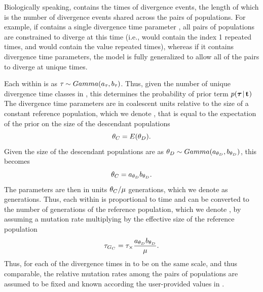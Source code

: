 \documentclass[letterpaper,12pt]{article}
\begin{document}
\begin{linenumbers}
Biologically speaking, \divTimeVector contains the times of divergence events,
the length of which \divTimeNum is the number of divergence events shared across
the \npairs{} pairs of populations.
For example, if \divTimeVector contains a single divergence time parameter
, all \npairs{} pairs of populations are constrained to diverge at
this time (i.e., \divTimeIndexVector would contain the index 1 repeated
\npairs{} times, and \divTimeMapVector would contain the value 
repeated \npairs{} times), whereas if it contains \npairs{} divergence time
parameters, the model is fully generalized to allow all of the pairs to diverge
at unique times.

\begin{linenomath}
Each \divTime{} within \divTimeVector is \iid as $\tau_{} \sim
Gamma(a_{\tau_{}}, b_{\tau_{}})$.
Thus, given the number of unique divergence time classes in
\divTimeIndexVector, this determines the probability of prior term
$p(\boldsymbol{\tau_{}} \,|\, \mathbf{t_{}})$
The divergence time parameters are in coalescent units relative to the size of
a constant reference population, which we denote , that is equal to
the expectation of the prior on the size of the descendant populations
\begin{equation}
    \myTheta{C} = E(\descendantTheta{}{}).
    \label{eq:thetaC}
\end{equation}
Given the size of the descendant populations are \iid as
$\descendantTheta{}{} \sim Gamma(\gammaShape{\descendantTheta{}{}},
\gammaScale{\descendantTheta{}{}})$,
this becomes
\begin{equation}
    \myTheta{C} = \gammaShape{\descendantTheta{}{}}\gammaScale{\descendantTheta{}{}}.
    \label{eq:thetaCGamma}
\end{equation}
The \divTime parameters are then in units $\theta_{C}/\mu$
generations, which we denote as \globalcoalunit generations.
Thus, each \divTime within \divTimeVector is proportional to time and
can be converted to the number of generations of the reference population,
which we denote , by assuming a mutation rate multiplying by
the effective size of the reference population
\begin{equation}
    \divTime{G_C} = \divTime \times \frac{
        \gammaShape{\descendantTheta{}{}}\gammaScale{\descendantTheta{}{}}}
        {\mutationRate}.
    \label{eq:divTimeGenerations}
\end{equation}
Thus, for each of the divergence times in \divTimeVector to be on the same
scale, and thus comparable, the relative mutation rates among the pairs of
populations are assumed to be fixed and known according the user-provided
values in \mutationRateScalarConstantVector.
\end{linenomath}


\end{linenumbers}
\end{document}
